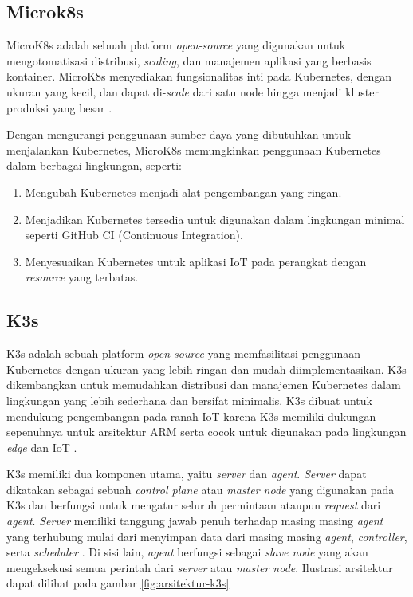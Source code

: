 \subsection{Microk8s}
MicroK8s adalah sebuah platform \textit{open-source} yang digunakan untuk mengotomatisasi distribusi, \textit{scaling}, dan manajemen aplikasi yang berbasis kontainer. MicroK8s menyediakan fungsionalitas inti pada Kubernetes, dengan ukuran yang kecil, dan dapat di-\textit{scale} dari satu node hingga menjadi kluster produksi yang besar \parencite{microk8s}.

Dengan mengurangi penggunaan sumber daya yang dibutuhkan untuk menjalankan Kubernetes, MicroK8s memungkinkan penggunaan Kubernetes dalam berbagai lingkungan, seperti:

\begin{enumerate}
  \item Mengubah Kubernetes menjadi alat pengembangan yang ringan.
  \item Menjadikan Kubernetes tersedia untuk digunakan dalam lingkungan minimal seperti GitHub CI (Continuous Integration).
  \item Menyesuaikan Kubernetes untuk aplikasi IoT pada perangkat dengan \textit{resource} yang terbatas.
\end{enumerate}


\subsection{K3s}
K3s adalah sebuah platform \textit{open-source} yang memfasilitasi penggunaan Kubernetes dengan ukuran yang lebih ringan dan mudah diimplementasikan. K3s dikembangkan untuk memudahkan distribusi dan manajemen Kubernetes dalam lingkungan yang lebih sederhana dan bersifat minimalis. K3s dibuat untuk mendukung pengembangan pada ranah IoT karena K3s memiliki dukungan sepenuhnya untuk arsitektur ARM serta cocok untuk digunakan pada lingkungan \textit{edge} dan IoT \parencite{k3s}.

K3s memiliki dua komponen utama, yaitu \textit{server} dan \textit{agent}. \textit{Server} dapat dikatakan sebagai sebuah \textit{control plane} atau \textit{master node} yang digunakan pada K3s dan berfungsi untuk mengatur seluruh permintaan ataupun \textit{request} dari \textit{agent}. \textit{Server} memiliki tanggung jawab penuh terhadap masing masing \textit{agent} yang terhubung mulai dari menyimpan data dari masing masing \textit{agent}, \textit{controller}, serta \textit{scheduler} \parencite{k3s}. Di sisi lain, \textit{agent} berfungsi sebagai \textit{slave node} yang akan mengeksekusi semua perintah dari \textit{server} atau \textit{master node}. Ilustrasi arsitektur dapat dilihat pada gambar \ref{fig:arsitektur-k3s}

